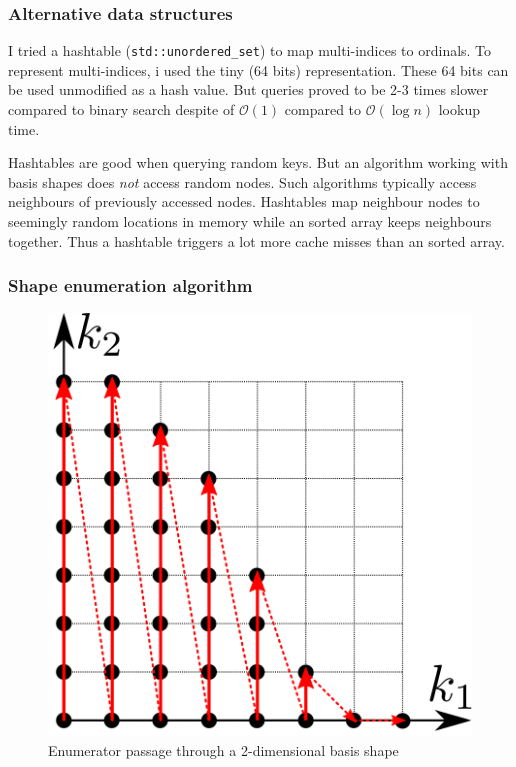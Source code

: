 \documentclass{article}
\def\code#1{\texttt{#1}}
\begin{document}
\subsubsection{Alternative data structures}
I tried a hashtable (\code{std::unordered\_set}) to map multi-indices to ordinals.
To represent multi-indices, i used the tiny (64 bits) representation.
These 64 bits can be used unmodified as a hash value.
But queries proved to be 2-3 times slower compared to binary search
despite of \(\mathcal{O}(1)\) compared to \(\mathcal{O}(\log{}n)\) lookup time.
\par
Hashtables are good when querying random keys. But an algorithm working
with basis shapes does \emph{not} access random nodes.
Such algorithms typically access neighbours of previously accessed nodes.
Hashtables map neighbour nodes to seemingly random locations in memory
while an sorted array keeps neighbours together. Thus a hashtable triggers
a lot more cache misses than an sorted array.

\subsubsection{Shape enumeration algorithm}

\begin{figure}[H]
  \centering
  \includegraphics[]{shape_enumerator}
  \caption{Enumerator passage through a 2-dimensional basis shape}
  \label{fig:shape_example}
\end{figure}
\end{document}
